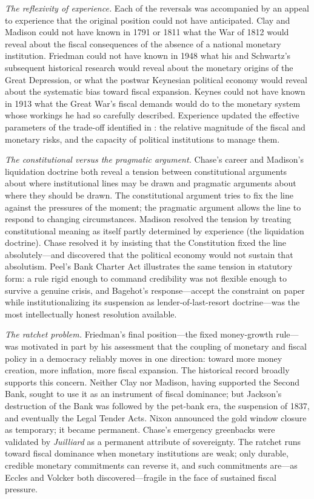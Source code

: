 \documentclass[12pt]{article}
\begin{document}
\textit{The reflexivity of experience.}  Each of the reversals was
accompanied by an appeal to experience that the original position could
not have anticipated.  Clay and Madison could not have known in 1791 or
1811 what the War of 1812 would reveal about the fiscal consequences of
the absence of a national monetary institution.  Friedman could not have
known in 1948 what his and Schwartz's subsequent historical research
would reveal about the monetary origins of the Great Depression, or
what the postwar Keynesian political economy would reveal about the
systematic bias toward fiscal expansion.  Keynes could not have known
in 1913 what the Great War's fiscal demands would do to the monetary
system whose workings he had so carefully described.  Experience updated
the effective parameters of the trade-off identified in
\citet{Sargent2011}: the relative magnitude of the fiscal and monetary
risks, and the capacity of political institutions to manage them.

\textit{The constitutional versus the pragmatic argument.}  Chase's
career and Madison's liquidation doctrine both reveal a tension between
constitutional arguments about where institutional lines may be drawn
and pragmatic arguments about where they should be drawn.  The
constitutional argument tries to fix the line against the pressures of
the moment; the pragmatic argument allows the line to respond to
changing circumstances.  Madison resolved the tension by treating
constitutional meaning as itself partly determined by experience
(the liquidation doctrine).  Chase resolved it by insisting that the
Constitution fixed the line absolutely---and discovered that the
political economy would not sustain that absolutism.  Peel's Bank
Charter Act illustrates the same tension in statutory form: a rule rigid
enough to command credibility was not flexible enough to survive a
genuine crisis, and Bagehot's response---accept the constraint on paper
while institutionalizing its suspension as lender-of-last-resort
doctrine---was the most intellectually honest resolution available.

\textit{The ratchet problem.}  Friedman's final position---the fixed
money-growth rule---was motivated in part by his assessment that the
coupling of monetary and fiscal policy in a democracy reliably moves
in one direction: toward more money creation, more inflation, more
fiscal expansion.  The historical record broadly supports this concern.
Neither Clay nor Madison, having supported the Second Bank, sought to
use it as an instrument of fiscal dominance; but Jackson's destruction
of the Bank was followed by the pet-bank era, the suspension of 1837,
and eventually the Legal Tender Acts.  Nixon announced the gold window
closure as temporary; it became permanent.  Chase's emergency greenbacks
were validated by \textit{Juilliard} as a permanent attribute of
sovereignty.  The ratchet runs toward fiscal dominance when monetary
institutions are weak; only durable, credible monetary commitments can
reverse it, and such commitments are---as Eccles and Volcker both
discovered---fragile in the face of sustained fiscal pressure.
\end{document}
